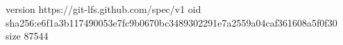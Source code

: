 version https://git-lfs.github.com/spec/v1
oid sha256:e6f1a3b117490053e7fc9b0670bc3489302291e7a2559a04caf361608a5f0f30
size 87544
